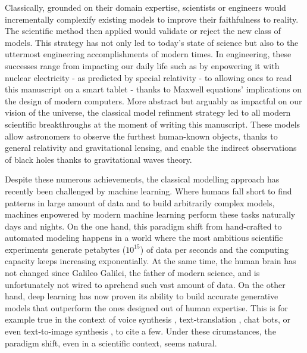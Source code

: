 Classically, grounded on their domain expertise, scientists or engineers would incrementally complexify existing models to improve their faithfulness to reality. The scientific method then applied would validate or reject the new class of models.
This strategy has not only led to today's state of science but also to the uttermost engineering accomplishments of modern times.
In engineering, these successes range from impacting our daily life such as by enpowering it with nuclear electricity - as predicted by special relativity - to
allowing ones to read this manuscript on a smart tablet - thanks to Maxwell equations' implications on the design of modern computers.
More abstract but arguably as impactful on our vision of the universe, the classical model refinment strategy led to all modern scientific breakthroughs at the moment of writing this manuscript. These models allow astronomers to observe the furthest human-known objects, thanks to general relativity and gravitational lensing, and enable the indirect observations of black holes thanks to gravitational waves theory.



Despite these numerous achievements, the classical modelling approach has recently been challenged by machine learning. Where humans fall short to find patterns in large amount of data and to build arbitrarily complex models, machines enpowered by modern machine learning perform these tasks naturally days and nights.
On the one hand, this paradigm shift from hand-crafted to automated modeling happens in a world where the most ambitious scientific experiments generate petabytes ($10^{15}$) of data per seconds \citep{noauthor_cern_nodate} and the computing capacity keeps increasing exponentially. At the same time, the human brain has not changed since Galileo Galilei, the father of modern science, and is unfortunately not wired to aprehend such vast amount of data. On the other hand, deep learning has now proven its ability to build accurate generative models that outperform the ones designed out of human expertise. This is for example true in the context of voice synthesis \citep{van_den_oord_wavenet_2016}, text-translation \citep{GPT3, bert...}, chat bots, or even text-to-image synthesis \citep{Dall-e-2, imagen}, to cite a few. Under these cirumstances, the paradigm shift, even in a scientific context, seems natural.

